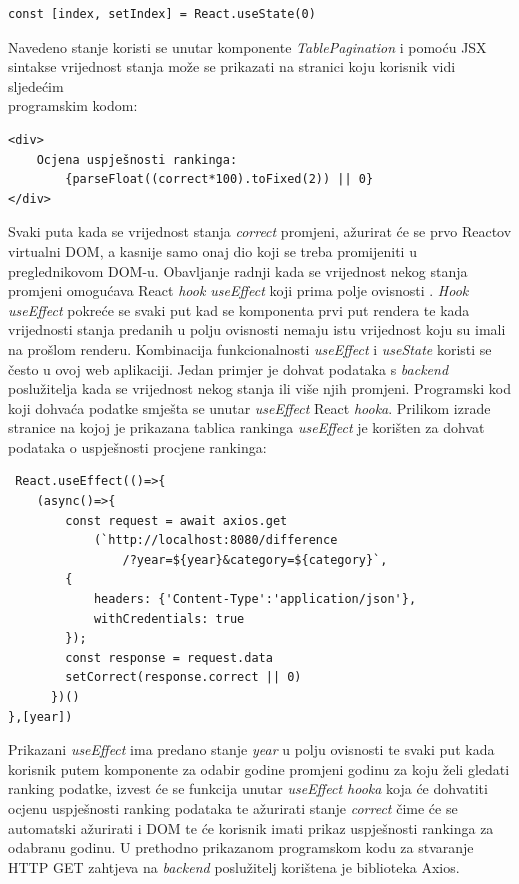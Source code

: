 \documentclass[times, utf8, zavrsni]{fer}
\begin{document}
\begin{verbatim}
const [index, setIndex] = React.useState(0)
\end{verbatim}
Navedeno stanje koristi se unutar komponente \emph{TablePagination} i pomoću JSX sintakse vrijednost stanja može se prikazati na stranici koju korisnik vidi sljedećim \\programskim kodom:
\begin{verbatim}
<div>
    Ocjena uspješnosti rankinga: 
        {parseFloat((correct*100).toFixed(2)) || 0}
</div>
\end{verbatim}
Svaki puta kada se vrijednost stanja \emph{correct} promjeni, ažurirat će se prvo Reactov virtualni DOM, a kasnije samo onaj dio koji se treba promijeniti u preglednikovom DOM-u.
Obavljanje radnji kada se vrijednost nekog stanja promjeni omogućava React \emph{hook useEffect} koji prima polje ovisnosti . \emph{Hook useEffect}
pokreće se svaki put kad se komponenta prvi put rendera te kada vrijednosti stanja predanih u polju ovisnosti nemaju istu vrijednost koju su imali na prošlom renderu.
Kombinacija funkcionalnosti \emph{useEffect} i \emph{useState} koristi se često u ovoj web aplikaciji. Jedan primjer je dohvat podataka s \emph{backend} poslužitelja 
kada se vrijednost nekog stanja ili više njih promjeni. Programski kod koji dohvaća podatke smješta se unutar \emph{useEffect} React \emph{hooka}.
Prilikom izrade stranice na kojoj je prikazana tablica rankinga \emph{useEffect} je korišten za dohvat podataka o uspješnosti procjene rankinga:
\begin{verbatim}
 React.useEffect(()=>{
    (async()=>{
        const request = await axios.get
            (`http://localhost:8080/difference
                /?year=${year}&category=${category}`,
        {
            headers: {'Content-Type':'application/json'},
            withCredentials: true
        });
        const response = request.data
        setCorrect(response.correct || 0)
      })()
},[year])
\end{verbatim}
Prikazani \emph{useEffect} ima predano stanje \emph{year} u polju ovisnosti te svaki put kada korisnik putem komponente za odabir godine promjeni 
godinu za koju želi gledati ranking podatke, izvest će se funkcija unutar \emph{useEffect hooka} koja će dohvatiti ocjenu uspješnosti ranking podataka te ažurirati stanje 
\emph{correct} čime će se automatski ažurirati i DOM te će korisnik imati prikaz uspješnosti rankinga za odabranu godinu.
U prethodno prikazanom programskom kodu za stvaranje HTTP GET zahtjeva na \emph{backend} poslužitelj korištena je biblioteka Axios.
\end{document}
